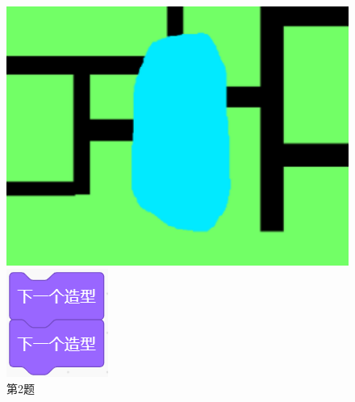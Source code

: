 \documentclass[10pt, a4paper]{article}
\begin{document}
\begin{enumerate}
        \begin{figure}[htbp]
            \centering
            \begin{minipage}[t]{.2\textwidth}
                \centering
                \includegraphics[width=1\textwidth]{2.png}
                \caption*{第2题}
            \end{minipage}
            \begin{minipage}[t]{.14\textwidth}
                \centering
                \includegraphics[width=\textwidth]{3.png}

\end{minipage}
\end{figure}
\end{enumerate}
\end{document}
